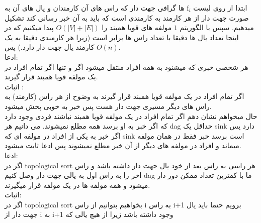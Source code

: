 \problem{}
ابتدا از روی لیست 
$\text{f}_i$
 ها گرافی جهت دار که راس های آن
کارمندان و یال های آن به صورت جهت دار از هر کارمند به کارمندی است که باید
به آن خبر رسانی کند تشکیل میدهیم.
سپس با الگوریتم $1$ مولفه های قویا همبند را $O(|V|+|E|)$ پیدا میکنیم که در اینجا
تعداد یال ها دقیقا با تعداد راس ها برابر است (زیرا هر کارمندی دقیقا به یک کارمند یال جهت دار دارد.)
پس $O(n)$.\\
ادعا:\\
هر شخصی خبری که میشنود به همه افراد منتقل میشود اگر و تنها اگر تمام افراد در یک مولفه
قویا همبند قرار گیرند.\\
اثبات :\\
اگر تمام افراد در یک مولفه قویا همبند قرار گیرند به وضوح از هر راس (کارمند)
به راس های دیگر مسیری جهت دار هست پس خبر به خوبی پخش میشود.\\
حال میخواهم نشان دهم اگر تمام افراد در یک مولفه قویا همبند نباشند 
فردی وجود دارد که اگر خبر به او برسد همه مطلع نمیشوند.
می دانیم هر dag حداقل یک sink دارد پس
اگر خبر به یکی از افراد در مولفه ای که sink است برسد
خبر فقط در همان مولفه میماند و افراد در مولفه های دیگر از آن خبر
مطلع نمیشوند پس ادعا ثابت میشود.\\
ادعا:\\
اگر در topological sort هر راسی به راس بعد از خود
یال جهت دار داشته باشد و راس اخر را به راس اول به یالی جهت دار وصل کنیم
dag ما با کمترین تعداد ممکن دور دار میشود و همه مولفه ها 
در یک مولفه قرار میگیرند.\\
اثبات:\\
اگر در topological sort بخواهیم بتوانیم از راس i به راس i+1
برویم حتما باید یال جهت دار از i به i+1 وجود داشته باشد
زیرا از هیچ یالی که
